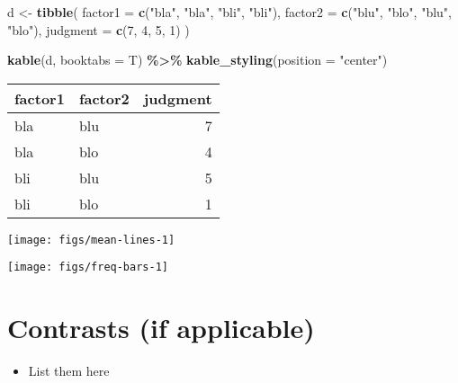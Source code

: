 \documentclass[
    numbers=noenddot,
    open=any,
    paper=a4,
    oneside,
    pagesize,
    captions=tableheading,
    bibliography=totoc,
    11pt
    ]{scrbook}
\newenvironment{Shaded}{\begin{snugshade}}{\end{snugshade}}
\newcommand{\DataTypeTok}[1]{\textcolor[rgb]{0.13,0.29,0.53}{#1}}
\newcommand{\DecValTok}[1]{\textcolor[rgb]{0.00,0.00,0.81}{#1}}
\newcommand{\KeywordTok}[1]{\textcolor[rgb]{0.13,0.29,0.53}{\textbf{#1}}}
\newcommand{\NormalTok}[1]{#1}
\newcommand{\OperatorTok}[1]{\textcolor[rgb]{0.81,0.36,0.00}{\textbf{#1}}}
\newcommand{\StringTok}[1]{\textcolor[rgb]{0.31,0.60,0.02}{#1}}
\providecommand{\tightlist}{%
    \setlength{\itemsep}{0pt}\setlength{\parskip}{0pt}}
\begin{document}
\begin{Shaded}
\begin{Highlighting}[]
\NormalTok{d \textless{}{-}}\StringTok{ }\KeywordTok{tibble}\NormalTok{(}
  \DataTypeTok{factor1 =} \KeywordTok{c}\NormalTok{(}\StringTok{"bla"}\NormalTok{, }\StringTok{"bla"}\NormalTok{, }\StringTok{"bli"}\NormalTok{, }\StringTok{"bli"}\NormalTok{),}
  \DataTypeTok{factor2 =} \KeywordTok{c}\NormalTok{(}\StringTok{"blu"}\NormalTok{, }\StringTok{"blo"}\NormalTok{, }\StringTok{"blu"}\NormalTok{, }\StringTok{"blo"}\NormalTok{),}
  \DataTypeTok{judgment =} \KeywordTok{c}\NormalTok{(}\DecValTok{7}\NormalTok{, }\DecValTok{4}\NormalTok{, }\DecValTok{5}\NormalTok{, }\DecValTok{1}\NormalTok{)}
\NormalTok{)}

\KeywordTok{kable}\NormalTok{(d, }\DataTypeTok{booktabs =}\NormalTok{ T) }\OperatorTok{\%\textgreater{}\%}
\StringTok{  }\KeywordTok{kable\_styling}\NormalTok{(}\DataTypeTok{position =} \StringTok{"center"}\NormalTok{)}
\end{Highlighting}
\end{Shaded}

\begin{table}[H]
\centering
\begin{tabular}{llr}
\toprule
factor1 & factor2 & judgment\\
\midrule
bla & blu & 7\\
bla & blo & 4\\
bli & blu & 5\\
bli & blo & 1\\
\bottomrule
\end{tabular}
\end{table}

\begin{center}\texttt{[image: figs/mean-lines-1]} \end{center}

\begin{center}\texttt{[image: figs/freq-bars-1]} \end{center}

\hypertarget{contrasts-if-applicable}{%
\section{Contrasts (if applicable)}\label{contrasts-if-applicable}}

\begin{itemize}
\tightlist
\item
  List them here \autocite{heimkratzer1998semantics}
\end{itemize}
\end{document}
